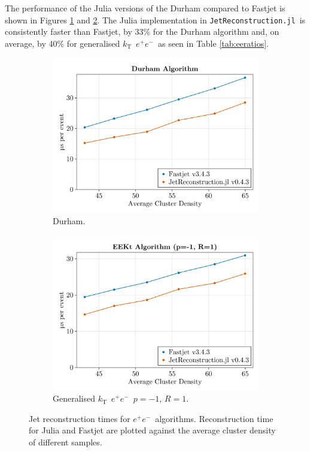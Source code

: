 \documentclass{webofc}
\newcommand{\kt}{${k}_\text{T}$}
\newcommand{\JR}{\texttt{JetReconstruction.jl}}
\newcommand{\ee}{$e^+e^-$}
\begin{document}
The performance of the Julia versions of the Durham compared to Fastjet is shown
in Figures \ref{fig:eeDurham} and \ref{fig:eeKt}. The Julia implementation in
\JR\ is consistently faster than Fastjet, by 33\% for the Durham algorithm and,
on average, by 40\% for generalised \kt\ \ee\, as seen in Table \ref{tab:eeratios}.

\begin{figure}[th]
    \begin{subfigure}{0.47\textwidth}
        \begin{center}
            \includegraphics[width=0.8\linewidth]{Alma9-AMD-Ryzen7-Julia-FastJet-Durham.png}
            \caption{Durham.}
            \label{fig:eeDurham}
        \end{center}
    \end{subfigure}
    \hfill
    \begin{subfigure}{0.47\textwidth}
        \begin{center}
            \includegraphics[width=0.8\linewidth]{Alma9-AMD-Ryzen7-Julia-FastJet-EEKt-R1.png}
            \caption{Generalised \kt\ \ee\ $p=-1$, $R=1$.}
            \label{fig:eeKt}
        \end{center}
    \end{subfigure}
    \caption{Jet reconstruction times for \ee\ algorithms. Reconstruction time for Julia and Fastjet are plotted against the average cluster density of different samples.}
    \label{fig:eeperf}
\end{figure}
\end{document}
